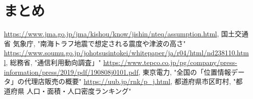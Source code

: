 \documentclass[a4paper, 9pt]{ltjsarticle}
\begin{document}
\section{まとめ} \label{label:conclusion}

\begin{thebibliography}{9}
   \url{https://www.jma.go.jp/jma/kishou/know/jishin/nteq/assumption.html}, 国土交通省 気象庁, "南海トラフ地震で想定される震度や津波の高さ"
   \url{https://www.soumu.go.jp/johotsusintokei/whitepaper/ja/r04/html/nd238110.html}, 総務省, "通信利用動向調査」"
   \url{https://www.tepco.co.jp/pg/company/press-information/press/2019/pdf/190808j0101.pdf}, 東京電力, "全国の「位置情報データ」の代理店販売の概要"
   \url{https://uub.jp/rnk/p\_j.html}, 都道府県市区町村, "都道府県 人口・面積・人口密度ランキング"
\end{thebibliography}
\end{document}
